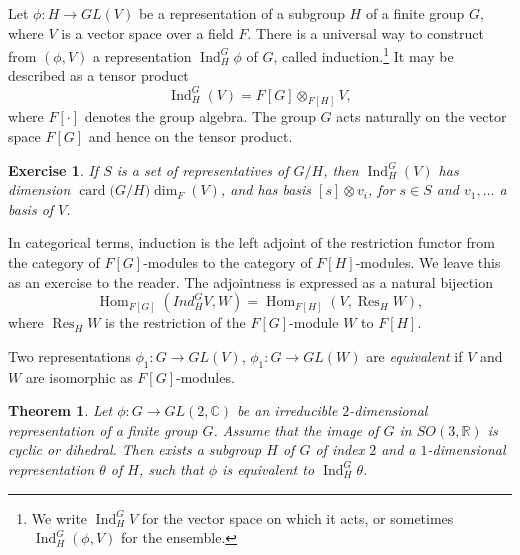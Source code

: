 \documentclass{amsart}
\def\op#1{{\operatorname{#1}}}
\newcommand{\ring}[1]{\mathbb{#1}}
\newtheorem{theorem}[equation]{Theorem}
\newtheorem{exercise}{Exercise}
\def\newterm#1{{\it #1}}
\def\card#1{\op{card}{#1}}
\begin{document}
Let $\phi:H\to GL(V)$ be a representation of a subgroup $H$ of a
finite group $G$, where $V$ is a vector space over a field $F$.  There
is a universal way to construct from $(\phi,V)$ a representation $\op{Ind}_H^G\phi$ of
$G$, called induction.\footnote{We write $\op{Ind}_H^G V$ for the vector space on
which it acts, or sometimes $\op{Ind}_H^G (\phi,V)$ for the ensemble.}  
It may be described as a tensor product
\[
\op{Ind}_H^G(V) = F[G]\otimes_{F[H]} V,
\]
where $F[\cdot]$ denotes the group algebra.  The group $G$ acts
naturally on the vector space $F[G]$ and hence on the tensor product.

\begin{exercise}
If $S$ is a set of representatives of $G/H$, then $\op{Ind}_H^G(V)$
has dimension $\card(G/H)\dim_F(V)$, and has basis $[s]\otimes v_i$,
for $s\in S$ and $v_1,\ldots $ a basis of $V$.
\end{exercise}

In categorical terms, induction is the left adjoint of the restriction functor
from the category of  $F[G]$-modules to the category of  $F[H]$-modules.
We leave this as an exercise to the reader.  The adjointness is expressed as a 
natural bijection
\begin{equation}\label{eqn:adjoint}
\op{Hom}_{F[G]}(Ind_H^G V,W) = \op{Hom}_{F[H]}(V,\op{Res}_H W),
\end{equation}
where $\op{Res}_H W$ is the restriction of the $F[G]$-module $W$ to $F[H]$.

Two representations $\phi_1:G\to GL(V)$, $\phi_1:G\to GL(W)$ are
\newterm{equivalent} if $V$ and $W$ are isomorphic as $F[G]$-modules.

\begin{theorem}
  Let $\phi:G\to GL(2,\ring{C})$ be an irreducible $2$-dimensional
  representation of a finite group $G$.  Assume that the image of $G$
  in $SO(3,\ring{R})$ is cyclic or dihedral.  Then exists a subgroup
  $H$ of $G$ of index $2$ and a $1$-dimensional representation
  $\theta$ of $H$, such that $\phi$ is equivalent to
  $\op{Ind}_H^G\theta$.
\end{theorem}
\end{document}
